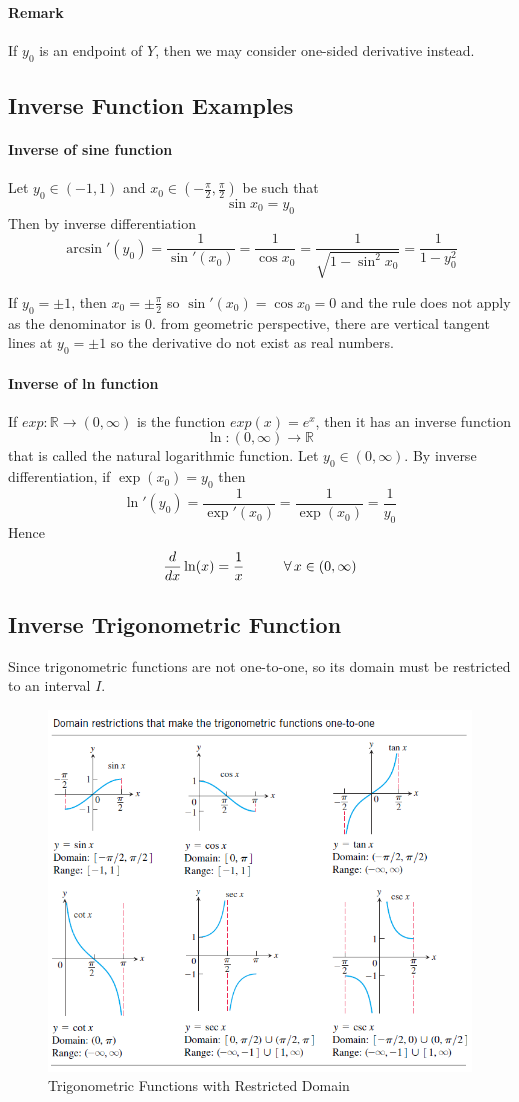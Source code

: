 \documentclass[12pt]{article}
\newcommand\tab[1][1cm]{\hspace*{#1}}
\begin{document}
\paragraph{Remark} If $y_0$ is an endpoint of $Y$, then we may consider one-sided derivative instead.

\subsection{Inverse Function Examples}
\paragraph{Inverse of sine function}
Let $y_0 \in (-1, 1)$ and $x_0 \in \left(-\frac{\pi}{2}, \frac{\pi}{2} \right)$ be such that 
\[
    \sin x_0 = y_0
\]
Then by inverse differentiation
\[
    \arcsin '(y_0) = \frac{1}{\sin '(x_0)} = \frac{1}{\cos x_0} = \frac{1}{\sqrt{1 - \sin^2 x_0}} = \frac{1}{1 - y_0^2}
\]

If $y_0 = \pm 1$, then $x_0 = \pm \frac{\pi}{2}$ so $\sin'(x_0) = \cos x_0 = 0$ and the rule does not apply as the denominator is 0. from
geometric perspective, there are vertical tangent lines at $y_0 = \pm 1$ so the derivative do not exist as real numbers.

\paragraph{Inverse of ln function}
If $exp : \mathbb{R} \to (0, \infty)$ is the function $exp(x) = e^x$, then it has an inverse function
\[
    \ln : (0, \infty) \to \mathbb{R}
\]
that is called the natural logarithmic function.
Let $y_0 \in (0, \infty)$. By inverse differentiation, if $\exp(x_0) = y_0$ then
\[
    \ln'(y_0) = \frac{1}{\exp'(x_0)} = \frac{1}{\exp(x_0)} = \frac{1}{y_0}
\]
Hence
\[
    \frac{d}{dx} \ln(x) = \frac{1}{x} \textrm{\tab} \forall \, x \in (0, \infty)
\]

\subsection{Inverse Trigonometric Function}
Since trigonometric functions are not one-to-one, so its domain must be restricted to an interval $I$. 
\begin{figure}[H] 
     \centering
     \includegraphics[width = 0.6\linewidth]{Images/trigonometric domain restricted.png}
     \caption{Trigonometric Functions with Restricted Domain}
\end{figure}
\end{document}
